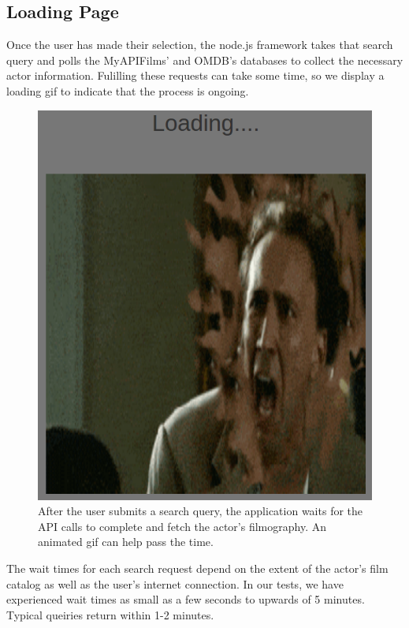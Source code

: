 \documentclass[12pt]{article}
\begin{document}
\subsection{Loading Page}

Once the user has made their selection, the node.js framework takes that search query and polls the MyAPIFilms' and OMDB's databases to collect the necessary actor information.  Fulilling these requests can take some time, so we display a loading gif to indicate that the process is ongoing.

			\begin{figure}[h!]
				\centering
				\includegraphics[scale=0.3]{images/loadingPage.png}
				\caption{After the user submits a search query, the application waits for the API calls to complete and fetch the actor's filmography. An animated gif can help pass the time.}
			\end{figure}

The wait times for each search request depend on the extent of the actor's film catalog as well as the user's internet connection.  In our tests, we have experienced wait times as small as a few seconds to upwards of 5 minutes. Typical queiries return within 1-2 minutes.
\end{document}

